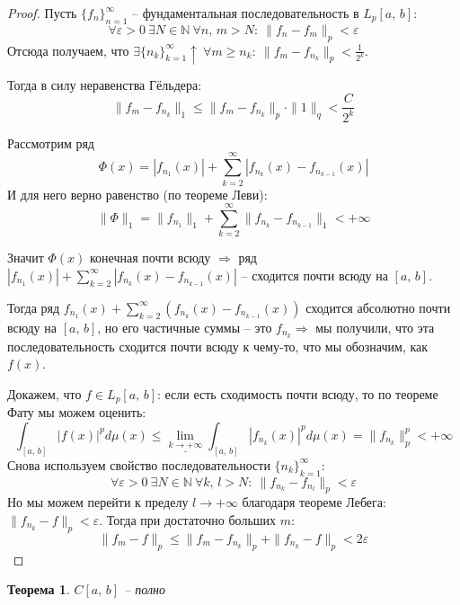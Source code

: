 \documentclass[a4paper,12pt]{article}
\renewcommand{\leq}{\ensuremath{\leqslant}}
\renewcommand{\geq}{\ensuremath{\geqslant}}
\theoremstyle{plain}
\newtheorem{theorem}{Теорема}[section]
\theoremstyle{definition}
\theoremstyle{remark}
\begin{document}
\begin{proof}
	Пусть $\{f_n\}_{n = 1}^\infty$ -- фундаментальная последовательность в $L_p[a,\,b]$:
	\[\forall \varepsilon > 0 \: \exists N \in \mathbb{N} \: \forall n,\,m > N :\: \|f_n - f_m\|_p < \varepsilon\]
	Отсюда получаем, что $\exists \{n_k\}_{k = 1}^\infty \uparrow \: \forall m \geq n_k :\: \|f_m - f_{n_k}\|_p < \frac{1}{2^k}$.

	Тогда в силу неравенства Гёльдера:
	\[\|f_m - f_{n_k}\|_1 \leq \|f_m - f_{n_k}\|_p \cdot \|1\|_q < \frac{C}{2^k}\]

	Рассмотрим ряд
	\[\Phi(x) = |f_{n_1}(x)| + \sum_{k = 2}^\infty |f_{n_k}(x) - f_{n_{k-1}}(x)|\]
	И для него верно равенство (по теореме Леви):
	\[\|\Phi\|_1 = \|f_{n_1}\|_1 + \sum_{k = 2}^\infty \|f_{n_k} - f_{n_{k-1}}\|_1 < +\infty\]

	Значит $\Phi(x)$ конечная почти всюду $\Rightarrow$ ряд $|f_{n_1}(x)| + \sum_{k = 2}^\infty |f_{n_k}(x) - f_{n_{k-1}}(x)|$ -- сходится почти всюду на $[a,\,b]$.

	Тогда ряд $f_{n_1}(x) + \sum_{k = 2}^\infty (f_{n_k}(x) - f_{n_{k-1}}(x))$ сходится абсолютно почти всюду на $[a,\,b]$, но его частичные суммы -- это $f_{n_k} \Rightarrow$ мы получили, что эта последовательность сходится почти всюду к чему-то, что мы обозначим, как $f(x)$.

	Докажем, что $f \in L_p[a,\,b]$: если есть сходимость почти всюду, то по теореме Фату мы можем оценить:
	\[\int_{[a,\,b]}|f(x)|^pd\mu(x) \leq \underline{\lim\limits_{k \to +\infty}} \int_{[a,\,b]}|f_{n_k}(x)|^pd\mu(x) = \|f_{n_k}\|_p^p < +\infty\]
	Снова используем свойство последовательности $\{n_k\}_{k = 1}^\infty$:
	\[\forall \varepsilon > 0 \: \exists N \in \mathbb{N} \: \forall k,\,l > N :\: \|f_{n_k} - f_{n_l}\|_p < \varepsilon\]
	Но мы можем перейти к пределу $l \to +\infty$ благодаря теореме Лебега: $\|f_{n_k} - f\|_p < \varepsilon$. Тогда при достаточно больших $m$:
	\[\|f_m - f\|_p \leq \|f_m - f_{n_k}\|_p + \|f_{n_k} - f\|_p < 2\varepsilon\]
\end{proof}

\begin{theorem}
	$C[a,\,b]$ -- полно
\end{theorem}
\end{document}

